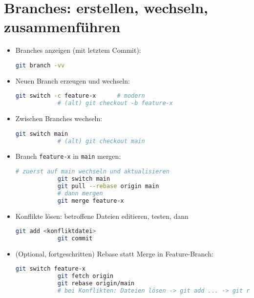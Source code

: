 \documentclass[a4paper,11pt]{article}
\begin{document}
	\section{Branches: erstellen, wechseln, zusammenführen}
	\begin{itemize}
		\item Branches anzeigen (mit letztem Commit):
		\begin{lstlisting}[language=bash]
			git branch -vv
		\end{lstlisting}
		\item Neuen Branch erzeugen und wechseln:
		\begin{lstlisting}[language=bash]
			git switch -c feature-x      # modern
			# (alt) git checkout -b feature-x
		\end{lstlisting}
		\item Zwischen Branches wechseln:
		\begin{lstlisting}[language=bash]
			git switch main
			# (alt) git checkout main
		\end{lstlisting}
		\item Branch \texttt{feature-x} in \texttt{main} mergen:
		\begin{lstlisting}[language=bash]
			# zuerst auf main wechseln und aktualisieren
			git switch main
			git pull --rebase origin main
			# dann mergen
			git merge feature-x
		\end{lstlisting}
		\item Konflikte lösen: betroffene Dateien editieren, testen, dann
		\begin{lstlisting}[language=bash]
			git add <konfliktdatei>
			git commit
		\end{lstlisting}
		\item (Optional, fortgeschritten) Rebase statt Merge in Feature-Branch:
		\begin{lstlisting}[language=bash]
			git switch feature-x
			git fetch origin
			git rebase origin/main
			# bei Konflikten: Dateien lösen -> git add ... -> git rebase --continue
		\end{lstlisting}
	\end{itemize}
	
\end{document}
